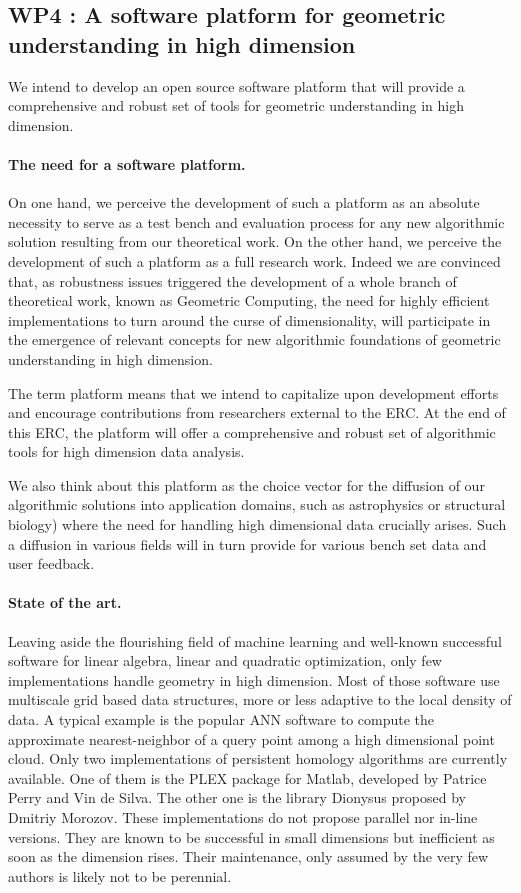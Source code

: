 
\subsection*{WP4 : A software platform for geometric understanding in high
  dimension}

We intend to develop an open source  software platform that will provide a
comprehensive and robust set of tools for geometric understanding in
high
dimension. 

\paragraph{ The need for a software platform.}
On one hand, we perceive the development of such a platform as 
an absolute necessity to serve as a test bench and  evaluation process
for any new algorithmic solution resulting  from  our theoretical work.
On the other hand, we perceive the development of such a platform as
a full research work. Indeed we are convinced that, as robustness
issues triggered the development of a whole branch of theoretical
work, known as Geometric Computing, the need for
highly efficient implementations to turn around the curse of  
dimensionality,  will participate in the emergence of relevant
concepts for new algorithmic foundations
of  geometric understanding in high dimension.


The term platform means that we intend to capitalize
upon development efforts and encourage contributions
from researchers external to the ERC.
 At the end of this ERC,
the platform will offer 
a comprehensive and robust set of algorithmic tools
for high dimension data analysis.

We also think about this platform as the choice
vector for the diffusion of our algorithmic solutions 
into application domains, such as astrophysics
or structural biology) 
 where the need for handling high dimensional
data crucially arises.  Such a diffusion in various fields
 will in turn provide for various bench set data 
and user feedback.



\paragraph{ State of the art.}  
Leaving aside the flourishing field of machine learning
and well-known successful software for linear algebra,
linear and quadratic optimization,  only  few implementations handle
geometry in high dimension. 
Most of those software use multiscale  grid based
data structures,  more or less adaptive
 to the local  density of data.
A typical example is the popular ANN software to compute  the approximate
nearest-neighbor of a query point
among a  high dimensional point cloud. 
Only two implementations of persistent homology algorithms are
currently available. One of them is the PLEX package for Matlab,
developed by Patrice Perry and Vin de Silva. The other one is the
library Dionysus proposed by Dmitriy Morozov. These implementations
do not propose parallel nor in-line versions. They are known to be
successful in small dimensions but inefficient as soon as the
dimension rises.  Their  maintenance, only assumed by the very few authors
is likely not to be perennial.


